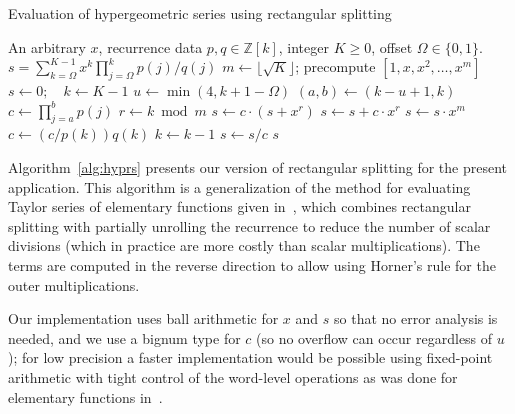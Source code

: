 \documentclass{siamart0216}
\begin{document}
\begin{algorithm}[h!]
  \caption{Evaluation of hypergeometric series using rectangular splitting}
  \small
  \label{alg:hyprs}
  \begin{algorithmic}[1]
    \Require An arbitrary $x$, recurrence data $p, q \in \mathbb{Z}[k]$, integer $K \ge 0$, offset $\Omega \in \{0,1\}$.
    \Ensure $s = \sum_{k=\Omega}^{K-1} x^k \prod_{j=\Omega}^k p(j) / q(j)$
    \State $m \gets \lfloor \sqrt K \rfloor$; precompute $[1, x, x^2, \ldots, x^m]$ 
    \State $s \gets 0; \quad k \gets K - 1$
        \State $u \gets \min(4, k + 1 - \Omega)$  
        \State $(a, b) \gets (k - u + 1, k)$  
        \State $c \gets \prod_{j=a}^b p(j)$ 
            \State $r \gets k \bmod m$
                \State $s \gets c \cdot (s + x^r)$ 
            \Else
                \State $s \gets s + c \cdot x^r$ 
            \EndIf
                \State $s \gets s \cdot x^m$ 
            \EndIf
            \State $c \gets (c / p(k)) q(k)$ 
            \State $k \gets k - 1$
        \EndWhile
        \State $s \gets s / c$
    \EndWhile
    \State \Return $s$
  \end{algorithmic}
\end{algorithm}

Algorithm \ref{alg:hyprs} presents our version of rectangular splitting
for the present application.
This algorithm is a generalization of the
method for evaluating Taylor series of elementary
functions given in~\cite{Johansson2015elementary},
which combines rectangular splitting
with partially unrolling the recurrence to reduce the number of scalar divisions
(which in practice are more costly than scalar multiplications).
The terms are computed in the reverse direction to allow
using Horner's rule for the outer
multiplications.

Our implementation uses ball arithmetic for $x$ and $s$
so that no error analysis is needed, and we use a bignum type for $c$ (so
no overflow can occur regardless of $u$);
for low precision a faster implementation
would be possible using fixed-point arithmetic with tight
control of the word-level operations
as was done for elementary functions in~\cite{Johansson2015elementary}.
\end{document}
